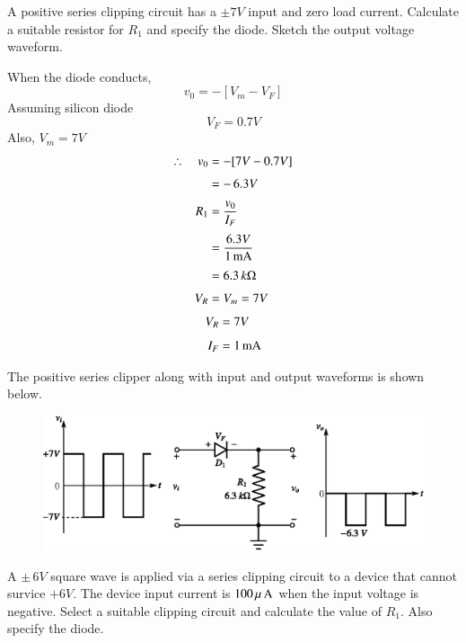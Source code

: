 \smallskip
\begin{example}\label{exam2.38}
A positive series clipping circuit has a $\pm 7V$ input and zero load current. Calculate a suitable resistor for $R_{1}$ and specify the diode. Sketch the output voltage waveform.
\end{example}

\begin{solution}
When the diode conducts,
$$
v_{0}=-[V_{m}-V_{F}]
$$
Assuming silicon diode
$$
V_{F}=0.7V
$$
Also, $V_{m}=7V$
\begin{align*}
\therefore\quad v_{0} &= -[7V-0.7V]\\[3pt]
&=-\,6.3V\\[3pt]
R_{1} &= \frac{v_{0}}{I_{F}}\\[3pt]
&= \frac{6.3V}{1\operatorname{mA}}\\[3pt]
&=6.3\,k\Omega\\[3pt]
V_{R} &= V_{m}=7V
\end{align*}
\begin{align*}
V_{R} &= 7V\\[4pt]
I_{F} &= 1\operatorname{mA}
\end{align*}

\eject

The positive series clipper along with input and output waveforms is shown below.
\begin{figure}[H]
\centering
\includegraphics{chap2/sol2.38.eps}
\end{figure}
\vskip -1cm
\end{solution}

\smallskip

\begin{example}\label{exam2.39}
A $\pm\, 6V$ square wave is applied via a series clipping circuit to a device that cannot survice $+6V$. The device input current is $100\,\mu \text{\,A}$ when the input voltage is negative. Select a suitable clipping circuit and calculate the value of $R_{1}$. Also specify the diode.
\end{example}

